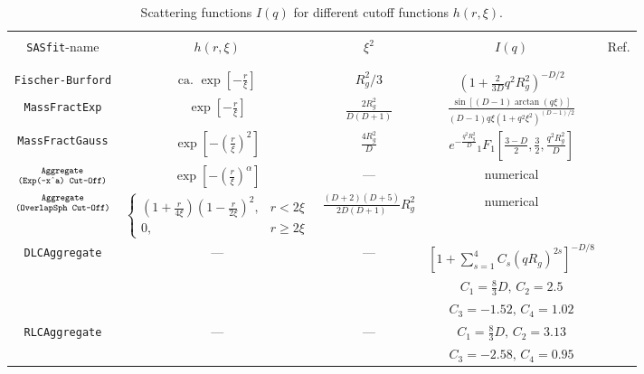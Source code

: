 \noindent

\begin{table}[htb]
\caption{Scattering functions $I(q)$ for different cutoff functions
$h(r,\xi)$.
\label{tab:SQ_cutuofffunctions}}
\begin{tabular}{|c|c|c|c|c|}
  \hline
  & & & & \\[-2mm]
  {\tt SASfit}-name & $h(r,\xi)$    & $\xi^2$   & $I(q)$    & Ref. \\
  & & & & \\[-2mm]
  \hline
  \hline
  & & & & \\[-2mm]
   {\tt \scriptsize Fischer-Burford}&  $\scriptstyle \text{ca. } \exp\left[-\tfrac{r}{\xi}\right]$  & $\scriptstyle R_g^2/3$ & $\scriptstyle \left(1+\frac{2}{3D}q^2R_g^2\right)^{-D/2}$ &  \\[3mm]
   {\tt \scriptsize MassFractExp}   & $\scriptstyle \exp\left[-\tfrac{r}{\xi}\right]$          & $\frac{2R_g^2}{D(D+1)}$ & $\scriptstyle \frac{\sin\left[(D-1)\arctan(q\xi)\right]}{(D-1)q\xi(1+q^2\xi^2)^{(D-1)/2}}$ &  \\[3mm]
   {\tt \scriptsize MassFractGauss} & $\scriptstyle \exp\left[-\left(\tfrac{r}{\xi}\right)^2\right]$ & $\frac{4R_g^2}{D}$ & $\scriptstyle e^{-\frac{q^2R_g^2}{D}} {}_1F_1\left[\frac{3-D}{2},\frac{3}{2},\frac{q^2R_g^2}{D}\right]$ &  \\[3mm]
   $\text{\tt \scriptsize Aggregate}\atop \text{\tt (Exp(-x$\hat~$a) Cut-Off)}$ & $\scriptstyle \exp\left[-\left(\tfrac{r}{\xi}\right)^\alpha\right]$ & --- & numerical &  \\[3mm]
   $\text{\tt \scriptsize Aggregate}\atop \text{\tt (OverlapSph Cut-Off)}$ & $ \scriptstyle
                                                    \begin{cases}\scriptstyle
                                                        \left(1+\tfrac{r}{4\xi}\right) \left(1-\tfrac{r}{2\xi}\right)^2 ,&  \scriptstyle r<2\xi\\
                                                        \scriptstyle 0 ,&  \scriptstyle r\geq 2\xi
                                                  \end{cases}$ & $\scriptstyle\frac{(D+2)(D+5)}{2D(D+1)}R_g^2$ & numerical &  \\[3mm]
   {\tt \scriptsize DLCAggregate} & --- & --- & $\scriptstyle \left[1+{\displaystyle \sum_{\scriptstyle s=1}^{\scriptstyle 4}}C_s(qR_g)^{2s}\right]^{-D/8}$ &  \\
                                          & & & $\scriptstyle C_1=\frac{8}{3}D, \, C_2=2.5$ & \\
                                          & & & $\scriptstyle C_3=-1.52, \, C_4=1.02$ & \\[3mm]
   {\tt \scriptsize RLCAggregate} & --- & --- & $\scriptstyle C_1=\frac{8}{3}D, \, C_2=3.13$ & \\
                                          & & & $\scriptstyle C_3=-2.58, \, C_4=0.95$ & \\[3mm]
  \hline
\end{tabular}
\end{table}


